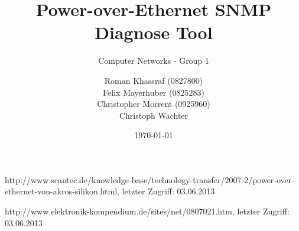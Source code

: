 \documentclass[a4paper, 12pt]{scrartcl}
\title{Power-over-Ethernet SNMP Diagnose Tool}
\subtitle{Computer Networks - Group 1}
\author{Roman Khassraf (0827800)\\ Felix Mayerhuber (0825283) \\ Christopher Morrent (0925960) \\ Christoph Wachter }
\date{\today}
\begin{document}
\maketitle







\begin{thebibliography}{4}

 http://www.scantec.de/knowledge-base/technology-transfer/2007-2/power-over-ethernet-von-akros-silikon.html, letzter Zugriff: 03.06.2013

 http://www.elektronik-kompendium.de/sites/net/0807021.htm, letzter Zugriff: 03.06.2013

\end{thebibliography}
\end{document}
